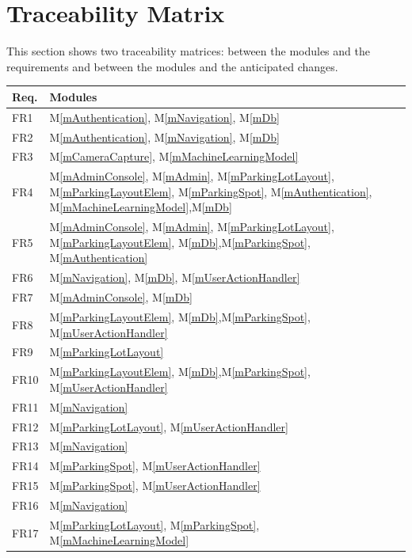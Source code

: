 \documentclass[12pt, titlepage]{article}
\newcommand{\mref}[1]{M\ref{#1}}
\begin{document}
\section{Traceability Matrix} \label{SecTM}
\color{black}
This section shows two traceability matrices: between the modules and the
requirements and between the modules and the anticipated changes.

\begin{table}[H]
\centering
\begin{tabular}{p{} p{}}
\toprule
\textbf{Req.} & \textbf{Modules}\\
\midrule
FR1 & \mref{mAuthentication}, \mref{mNavigation}, \mref{mDb}\\
FR2 & \mref{mAuthentication}, \mref{mNavigation}, \mref{mDb}\\
FR3 & \mref{mCameraCapture}, \mref{mMachineLearningModel}\\
FR4 & \mref{mAdminConsole}, \mref{mAdmin}, \mref{mParkingLotLayout},
\mref{mParkingLayoutElem}, \mref{mParkingSpot}, \mref{mAuthentication},
\mref{mMachineLearningModel},\mref{mDb}\\
FR5 & \mref{mAdminConsole}, \mref{mAdmin}, \mref{mParkingLotLayout},
\mref{mParkingLayoutElem}, \mref{mDb},\mref{mParkingSpot},
\mref{mAuthentication}\\
FR6 & \mref{mNavigation}, \mref{mDb}, \mref{mUserActionHandler}\\
FR7 & \mref{mAdminConsole}, \mref{mDb}\\
FR8 & \mref{mParkingLayoutElem}, \mref{mDb},\mref{mParkingSpot},
\mref{mUserActionHandler}\\
FR9 & \mref{mParkingLotLayout}\\
FR10 & \mref{mParkingLayoutElem}, \mref{mDb},\mref{mParkingSpot},
\mref{mUserActionHandler}\\
FR11 & \mref{mNavigation}\\
FR12 & \mref{mParkingLotLayout}, \mref{mUserActionHandler}\\
FR13 & \mref{mNavigation}\\
FR14 & \mref{mParkingSpot}, \mref{mUserActionHandler}\\
FR15 & \mref{mParkingSpot}, \mref{mUserActionHandler}\\
FR16 & \mref{mNavigation}\\
FR17 & \mref{mParkingLotLayout}, \mref{mParkingSpot},
\mref{mMachineLearningModel}\\

\end{tabular}
\end{table}
\end{document}

